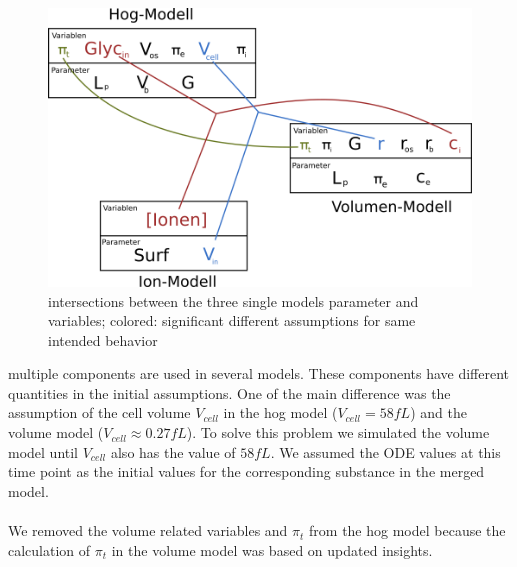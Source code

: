 \begin{figure}[h!]
	\begin{center}
		\begin{minipage}{0,8\textwidth}
			
			\includegraphics[width=\textwidth]{picture/model_intersections.png}
			\caption{intersections between the three single models parameter and variables; colored: significant different assumptions for same intended behavior} 
			\label{IntersectionsOfTheModels} 
		\end{minipage}
	\end{center}
\end{figure}

 multiple components are used in several models. These components have different quantities in the initial assumptions. One of the main difference was the assumption of the cell volume $V_{cell}$ in the hog model ($V_{cell}=58fL $) and the volume model ($V_{cell} \approx 0.27fL$). To solve this problem we simulated the volume model until $V_{cell}$ also has the value of $58fL$. We assumed the ODE values at this time point as the initial values for the corresponding substance in the merged model. \\\\
We removed the volume related variables and $\pi_t$ from the hog model because the calculation of $\pi_t$ in the volume model was based on updated insights.


